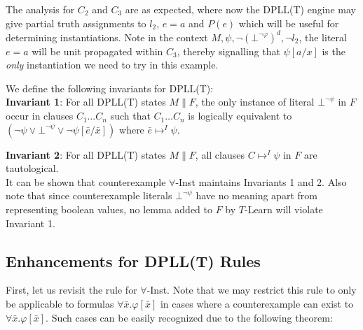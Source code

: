 \documentclass{llncs}
\begin{document}
The analysis for $C_2$ and $C_3$ are as expected, where now the DPLL(T) engine may give partial truth assignments to $l_2$, $e = a$ and $P( e )$ which will be useful for determining instantiations.
Note in the context $M, \psi, \neg( \bot^{\neg \varphi} )^d, \neg l_2$, the literal $e = a$ will be unit propagated within $C_3$, thereby signalling that $\psi[a/x]$ is the \emph{only} instantiation we need to try in this example.

We define the following invariants for DPLL(T): \\

{\bf Invariant 1}:
For all DPLL(T) states $M \parallel F$, the only instance of literal $\bot^{\neg \psi}$ in $F$ occur in clauses $C_1 \ldots C_n$ such that $C_1 \ldots C_n$ is logically equivalent to $( \neg \psi \vee \bot^{\neg \psi} \vee \neg \psi[\bar{e}/\bar{x}] )$ where $\bar{e} \mapsto^I \psi$.

{\bf Invariant 2}:
For all DPLL(T) states $M \parallel F$, all clauses $C \mapsto^I \psi$ in $F$ are tautological. \\

It can be shown that counterexample $\forall$-Inst maintains Invariants 1 and 2.
Also note that since counterexample literals $\bot^{ \neg \psi }$ have no meaning apart from representing boolean values, no lemma added to $F$ by $T$-Learn will violate Invariant 1.

\subsection{Enhancements for DPLL(T) Rules}

First, let us revisit the rule for $\forall$-Inst.
Note that we may restrict this rule to only be applicable to formulas $\forall \bar{x}. \varphi[ \bar{ x } ]$ in cases where a counterexample can exist to $\forall \bar{x}. \varphi[ \bar{ x } ]$.
Such cases can be easily recognized due to the following theorem:
\end{document}
